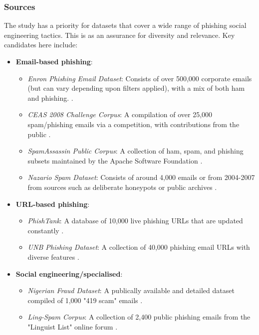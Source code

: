 
\subsubsection*{Sources}
The study has a priority for datasets that cover a wide range of phishing social engineering tactics. This is as an assurance for diversity and relevance. Key candidates here include:

\begin{itemize}
  \item \textbf{Email-based phishing}:
  \begin{itemize}
    \item \textit{Enron Phishing Email Dataset}: Consists of over 500,000 corporate emails (but can vary depending upon filters applied), with a mix of both ham and phishing. \citep{klimt2004enron}.
    \item \textit{CEAS 2008 Challenge Corpus}: A compilation of over 25,000 spam/phishing emails via a competition, with contributions from the public \citep{cormack2008email}.
    \item \textit{SpamAssassin Public Corpus}: A collection of ham, spam, and phishing subsets maintained by the Apache Software Foundation \citep{spamassassin2003}.
    \item \textit{Nazario Spam Dataset}: Consists of around 4,000 emails or from 2004-2007 from sources such as deliberate honeypots or public archives \citep{nazario2007phishing}.
  \end{itemize}
\item \textbf{URL-based phishing}:
\begin{itemize}
  \item \textit{PhishTank}: A database of 10,000 live phishing URLs that are updated constantly \citep{phishTank2023}.
  \item \textit{UNB Phishing Dataset}: A collection of 40,000 phishing email URLs with diverse features \citep{unb2016phishing}.
\end{itemize}
\item \textbf{Social engineering/specialised}:
  \begin{itemize}
    \item \textit{Nigerian Fraud Dataset}: A publically available and detailed dataset compiled of 1,000 "419 scam" emails \citep{champa2024phishing}.
    \item \textit{Ling-Spam Corpus}: A collection of 2,400 public phishing emails from the "Linguist List" online forum \citep{ling2005spam}.
  \end{itemize}
\end{itemize}

